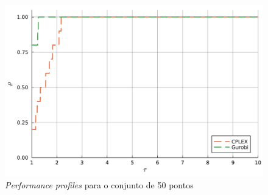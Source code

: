 \begin{figure}
    \centering
    \caption{\emph{Performance profiles} para o conjunto de 50 pontos}\label{fig:pgraph50}
    \includegraphics[scale=0.6]{imagens/pgraph50.pdf}
\end{figure}





